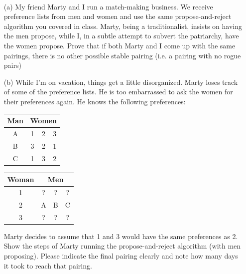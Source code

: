 \documentclass[11pt]{article}
\newif\ifsolutions
\begin{document}
\begin{qunlist}
\begin{itemize}
\ifsolutions
\textbf{Solutions:} This proof is incorrect. The use of $\max(x-1, y-1)$ is not correct, 
since $x-1$ and $y-1$ will be negative when $x=0$ or $y=0$.
Then the inductive hypothesis no longer applies, since $x-1$ and $y-1$ 
fall outside the range of natural numbers. We cannot conclude that $x-1 \leq y-1$ and the proof fails.
\fi


\end{itemize}




 \\ 

\begin{itemize}
\item[(a)] My friend Marty and I run a match-making business. 
We receive preference lists from men and women and use the same propose-and-reject algorithm you covered in class. 
Marty, being a traditionalist, insists on having the men propose, 
while I, in a subtle attempt to subvert the patriarchy, have the women propose. 
Prove that if both Marty and I come up with the same pairings, there is no other possible stable pairing 
(i.e. a pairing with no rogue pairs)

\ifsolutions
\textbf{Solutions:}
\fi


\item[(b)] While I'm on vacation, things get a little disorganized. 
Marty loses track of some of the preference lists. 
He is too embarrassed to ask the women for their preferences again. He knows the following preferences:

\begin{center}
\begin{tabular}{|c|ccc|}\hline 
Man&\multicolumn{3}{|c|}{Women}\\\hline 
A&1&2&3\\\hline 
B&3&2&1\\\hline 
C&1&3&2\\\hline
\end{tabular} 
\hspace{2cm}
\begin{tabular}{|c|ccc|}\hline 
Woman&\multicolumn{3}{|c|}{Men}\\\hline 
1&?&?&?\\\hline 
2&A&B&C\\\hline 
3&?&?&?\\\hline
\end{tabular}
\end{center}
   
Marty decides to assume that 1 and 3 would have the same preferences as 2. 
Show the steps of Marty running the propose-and-reject algorithm (with men proposing). 
Please indicate the final pairing clearly and note how many days it took to reach that pairing.


\end{itemize}
\end{qunlist}
\end{document}

